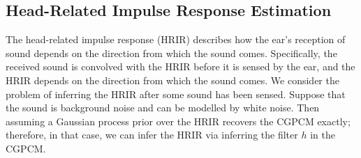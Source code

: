 \documentclass{article}
\newcommand{\cond}{\, | \,}               %
\begin{document}


\subsection{Head-Related Impulse Response Estimation}
The head-related impulse response (HRIR) describes how the ear's reception of sound depends on the direction from which the sound comes. Specifically, the received sound is convolved with the HRIR before it is sensed by the ear, and the HRIR depends on the direction from which the sound comes. We consider the problem of inferring the HRIR after some sound has been sensed. Suppose that the sound is background noise and can be modelled by white noise. Then assuming a Gaussian process prior over the HRIR recovers the CGPCM exactly; therefore, in that case, we can infer the HRIR via inferring the filter $h$ in the CGPCM.
\end{document}
